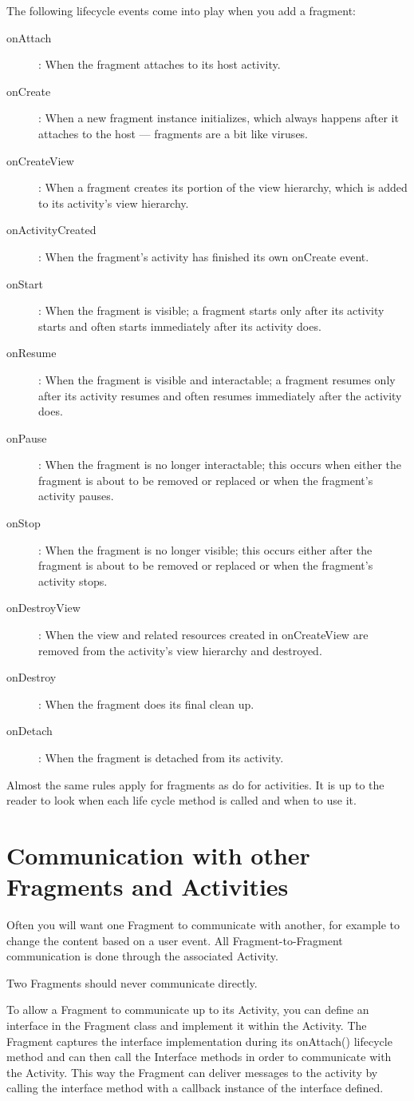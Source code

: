 The following lifecycle events come into play when you add a fragment:
\begin{description}

\item[onAttach] : When the fragment attaches to its host activity.
\item[onCreate] : When a new fragment instance initializes, which always happens after it attaches to the host — fragments are a bit like viruses.
\item[onCreateView] : When a fragment creates its portion of the view hierarchy, which is added to its activity’s view hierarchy.
\item[onActivityCreated]: When the fragment’s activity has finished its own onCreate event.
\item[onStart] : When the fragment is visible; a fragment starts only after its activity starts and often starts immediately after its activity does.
\item[onResume] : When the fragment is visible and interactable; a fragment resumes only after its activity resumes and often resumes immediately after the activity does.
\item[onPause] : When the fragment is no longer interactable; this occurs when either the fragment is about to be removed or replaced or when the fragment’s activity pauses.
\item[onStop] : When the fragment is no longer visible; this occurs either after the fragment is about to be removed or replaced or when the fragment’s activity stops.
\item[onDestroyView] : When the view and related resources created in onCreateView are removed from the activity’s view hierarchy and destroyed.
\item[onDestroy] : When the fragment does its final clean up.
\item[onDetach] : When the fragment is detached from its activity.
\end{description}
Almost the same rules apply for fragments as do for activities. It is up to the reader to look when each life cycle method is called and when to use it. 

\section{Communication with other Fragments and Activities}

Often you will want one Fragment to communicate with another, for example to change the content based on a user event. All Fragment-to-Fragment communication is done through the associated Activity. 
\begin{framed}
Two Fragments should never communicate directly.
\end{framed}
To allow a Fragment to communicate up to its Activity, you can define an interface in the Fragment class and implement it within the Activity. The Fragment captures the interface implementation during its onAttach() lifecycle method and can then call the Interface methods in order to communicate with the Activity. This way the Fragment can deliver messages to the activity by calling the interface method with a callback instance of the interface defined. 

